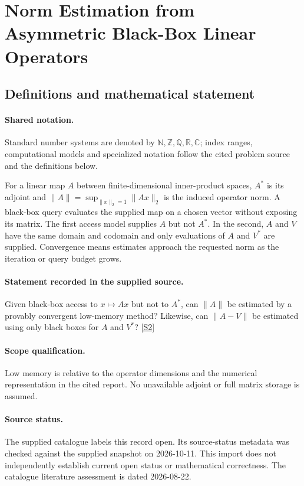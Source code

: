 \documentclass[11pt]{article}
\newcommand{\sref}[2]{\hyperlink{source:#1:#2}{[S#2]}}
\begin{document}
\section{Norm Estimation from Asymmetric Black-Box Linear Operators}\label{statement}

\subsection{Definitions and mathematical statement}

\paragraph{Shared notation.}Standard number systems are denoted by $\mathbb N,\mathbb Z,\mathbb Q,\mathbb R,\mathbb C$; index ranges, computational models and specialized notation follow the cited problem source and the definitions below.


For a linear map $A$ between finite-dimensional inner-product spaces, $A^*$ is its adjoint and $\lVert A\rVert=\sup_{\lVert x\rVert_2=1}\lVert Ax\rVert_2$ is the induced operator norm. A black-box query evaluates the supplied map on a chosen vector without exposing its matrix. The first access model supplies $A$ but not $A^*$. In the second, $A$ and $V$ have the same domain and codomain and only evaluations of $A$ and $V^*$ are supplied. Convergence means estimates approach the requested norm as the iteration or query budget grows.
\paragraph{Statement recorded in the supplied source.}
Given black-box access to $x\mapsto Ax$ but not to $A^*$, can $\lVert A\rVert$ be estimated by a provably convergent low-memory method? Likewise, can $\lVert A-V\rVert$ be estimated using only black boxes for $A$ and $V^*$? \sref{statement}{2}
\paragraph{Scope qualification.}
Low memory is relative to the operator dimensions and the numerical representation in the cited report. No unavailable adjoint or full matrix storage is assumed.
\paragraph{Source status.}
The supplied catalogue labels this record open. Its source-status metadata was checked against the supplied snapshot on 2026-10-11. This import does not independently establish current open status or mathematical correctness. The catalogue literature assessment is dated 2026-08-22.
\end{document}
